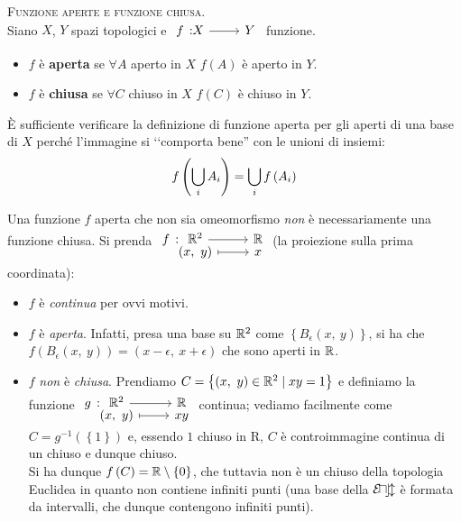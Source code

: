 \begin{define}\textsc{Funzione aperte e funzione chiusa.}\\
Siano $X$, $Y$ spazi topologici e $\funz{f}{X}{Y}$ funzione.
\begin{itemize}
\item $f$ è \textbf{aperta} se $\forall A$ aperto in $X$ $f\left(A\right)$ è aperto in $Y$.
\item $f$ è \textbf{chiusa} se $\forall C$ chiuso in $X$ $f\left(C\right)$ è chiuso in $Y$.
\end{itemize}
\vspace{-3mm}
\end{define}
\begin{observe}
	È sufficiente verificare la definizione di funzione aperta per gli aperti di una base di $X$ perché l'immagine si ‘‘comporta bene'' con le unioni di insiemi:
	\begin{equation*}
		f\left(\mathop{{\bigcup}}\displaylimits_{i}A_i\right)=\mathop{{\bigcup}}\displaylimits_{i}f\left(A_i\right)
	\end{equation*}
\vspace{-6mm}
\end{observe}
\begin{attention}
	Una funzione $f$ aperta che non sia omeomorfismo \textit{non} è necessariamente una funzione chiusa. Si prenda $\funztot{f}{\realset^2}{\realset}{\left(x,\ y\right)}{x}$ (la proiezione sulla prima coordinata):
	\begin{itemize}
		\item $f$ è \textit{continua} per ovvi motivi.
		\item $f$ è \textit{aperta}. Infatti, presa una base su $\mathbb{R}^2$ come $\left\{B_{\epsilon}\left(x,\ y\right)\right\}$, si ha che $f\left(B_{\epsilon}\left(x,\ y\right)\right)=\left(x-\epsilon,\ x+\epsilon\right)$ che sono aperti in $\mathbb{R}$.
		\item $f$ \textit{non} è \textit{chiusa}. Prendiamo $C=\left\{\left(x,\ y\right)\in \mathbb{R}^2\mid xy=1 \right\}$ e definiamo la funzione $\funztot{g}{\realset^2}{\realset}{\left(x,\ y\right)}{xy}$ continua; vediamo facilmente come $C=g^{-1}\left(\left\{1\right\}\right)$ e, essendo ${1}$ chiuso in $\mathrm{R}$, $C$ è controimmagine continua di un chiuso e dunque chiuso.\\
		Si ha dunque $f\left(C\right)=\mathbb{R}\setminus\left\{0\right\}$, che tuttavia non è un chiuso della topologia Euclidea in quanto non contiene infiniti punti (una base della $\mathcal{E\! u\! c\! l}$ è formata da intervalli, che dunque contengono infiniti punti).
	\end{itemize}
\vspace{-3mm}
\end{attention}
